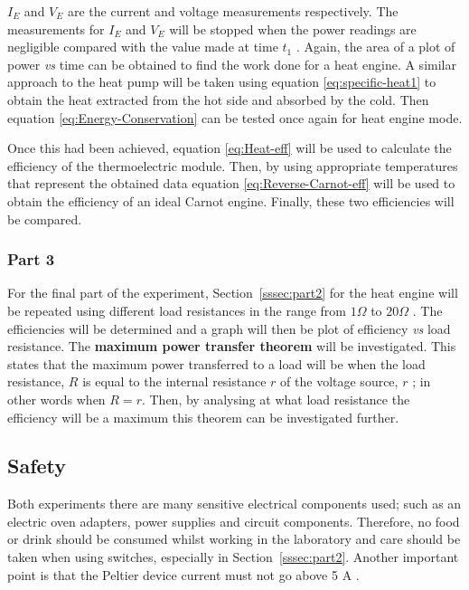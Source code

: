 \documentclass{article}
\newcommand{\secref}[2][Section~]{#1\ref{#2}}
\begin{document}
\vspace{2mm}  
\noindent
$I_E$ and $V_E$ are the current and voltage measurements respectively. The measurements for $I_E$ and $V_E$ will be stopped when the power readings are negligible compared with the value made at time $t_1$ \cite{Paper02}. Again, the area of a plot of power \textit{vs} time can be obtained to find the work done for a heat engine. A similar approach to the heat pump will be taken using equation \eqref{eq:specific-heat1} to obtain the heat extracted from the hot side and absorbed by the cold. Then equation \eqref{eq:Energy-Conservation} can be tested once again for heat engine mode. 

\vspace{2mm}  
\noindent
Once this had been achieved, equation \eqref{eq:Heat-eff} will be used to calculate the efficiency of the thermoelectric module. Then, by using appropriate temperatures that represent the obtained data equation \eqref{eq:Reverse-Carnot-eff} will be used to obtain the efficiency of an ideal Carnot engine. Finally, these two efficiencies will be compared.

\subsubsection{Part 3}
\label{sssec:part3}

For the final part of the experiment, \secref{sssec:part2} for the heat engine will be repeated using different load resistances in the range from $1 \Omega$ to $20 \Omega$ \cite{Paper02}. The efficiencies will be determined and a graph will then be plot of efficiency \textit{vs} load resistance. The \textbf{maximum power transfer theorem} will be investigated. This states that the maximum power transferred to a load will be when the load resistance, $R$ is equal to the internal resistance $r$ of the voltage source, $r$ \cite{Paper02}; in other words when $R = r$. Then, by analysing at what load resistance the efficiency will be a maximum this theorem can be investigated further.

\subsection{Safety}
\label{ssec:safety}
Both experiments there are many sensitive electrical components used; such as an electric oven adapters, power supplies and circuit components. Therefore, no food or drink should be consumed whilst working in the laboratory and care should be taken when using switches, especially in \secref{sssec:part2}. Another important point is that the Peltier device current must not go above 5 A \cite{Paper02}. 
\end{document}
